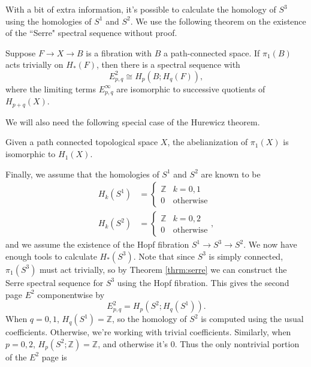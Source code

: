 \documentclass[twoside,10pt]{article}
\begin{document}
\begin{ex}
	With a bit of extra information, it's possible to calculate the homology of $S^{3}$ using the homologies of $S^{1}$ and $S^{2}$. We use the following theorem on the existence of the ``Serre" spectral sequence without proof.

	 \begin{thrm}[]
		 \label{thrm:serre}
		 Suppose $F\to X\to B$ is a fibration with $B$ a path-connected space. If $\pi_1(B)$ acts trivially on $H_{*}(F)$, then there is a spectral sequence with
		 \[
			 E_{p,q}^{2}\cong H_{p}(B;H_{q}(F)),
		 \] 
		 where the limiting terms $E_{p,q}^{\infty}$ are isomorphic to successive quotients of $H_{p+q}(X)$.
	\end{thrm}
	We will also need the following special case of the Hurewicz theorem.
	\begin{lem}
		\label{lem:hur}
		Given a path connected topological space $X$, the abelianization of $\pi_1(X)$ is isomorphic to $H_{1}(X)$.
	\end{lem}
	Finally, we assume that the homologies of $S^{1}$ and $S^{2}$ are known to be
	\begin{align*}
		H_{k}(S^{1}) &=
		\begin{cases}
			\mathbb{Z}&k=0,1\\
			0&\text{otherwise}
		\end{cases}\\
		H_{k}(S^{2}) &=
                \begin{cases}
                        \mathbb{Z}&k=0,2\\
                        0&\text{otherwise}
                \end{cases},
	\end{align*}
	and we assume the existence of the Hopf fibration $S^{1}\to S^{3}\to S^{2}$. We now have enough tools to calculate $H_{*}(S^{3})$. Note that since $S^{3}$ is simply connected, $\pi_1(S^{3})$ must act trivially, so by Theorem \ref{thrm:serre} we can construct the Serre spectral sequence for $S^{3}$ using the Hopf fibration. This gives the second page $E^{2}$ componentwise by
	\[
		E_{p,q}^{2}= H_{p}(S^{2}; H_{q}(S^{1})).
	\] 
	When $q=0,1$, $H_{q}(S^{1})=\mathbb{Z}$, so the homology of $S^{2}$ is computed using the usual coefficients. Otherwise, we're working with trivial coefficients. Similarly, when $p=0,2$, $H_{p}(S^2;\mathbb{Z})=\mathbb{Z}$, and otherwise it's 0. Thus the only nontrivial portion of the $E^2$ page is
	\begin{center}

\end{center}
\end{ex}
\end{document}
